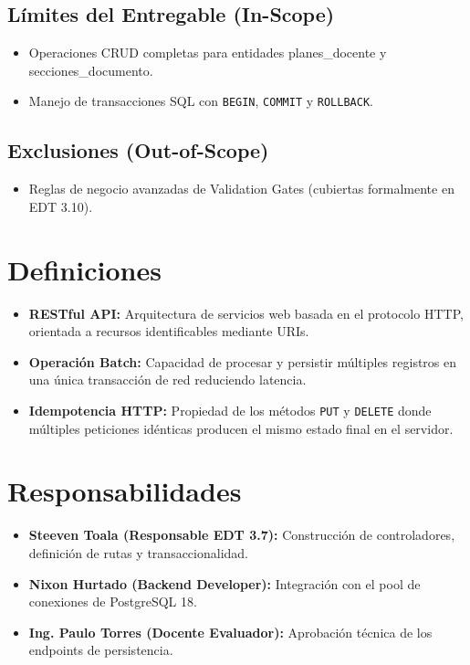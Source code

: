 \documentclass[12pt,a4paper]{article}
\begin{document}
\subsection{Límites del Entregable (In-Scope)}
\begin{itemize}[leftmargin=1.5em, itemsep=2pt]
    \item Operaciones CRUD completas para entidades planes\allowbreak\_docente y secciones\allowbreak\_documento.
    \item Manejo de transacciones SQL con \texttt{BEGIN}, \texttt{COMMIT} y \texttt{ROLLBACK}.
\end{itemize}
\subsection{Exclusiones (Out-of-Scope)}
\begin{itemize}[leftmargin=1.5em, itemsep=2pt]
    \item Reglas de negocio avanzadas de Validation Gates (cubiertas formalmente en EDT 3.10).
\end{itemize}

\section{Definiciones}
\begin{itemize}[leftmargin=1.5em, itemsep=2pt]
    \item \textbf{RESTful API:} Arquitectura de servicios web basada en el protocolo HTTP, orientada a recursos identificables mediante URIs.
    \item \textbf{Operación Batch:} Capacidad de procesar y persistir múltiples registros en una única transacción de red reduciendo latencia.
    \item \textbf{Idempotencia HTTP:} Propiedad de los métodos \texttt{PUT} y \texttt{DELETE} donde múltiples peticiones idénticas producen el mismo estado final en el servidor.
\end{itemize}

\section{Responsabilidades}
\begin{itemize}[leftmargin=1.5em, itemsep=2pt]
    \item \textbf{Steeven Toala (Responsable EDT 3.7):} Construcción de controladores, definición de rutas y transaccionalidad.
    \item \textbf{Nixon Hurtado (Backend Developer):} Integración con el pool de conexiones de PostgreSQL 18.
    \item \textbf{Ing. Paulo Torres (Docente Evaluador):} Aprobación técnica de los endpoints de persistencia.
\end{itemize}
\end{document}
